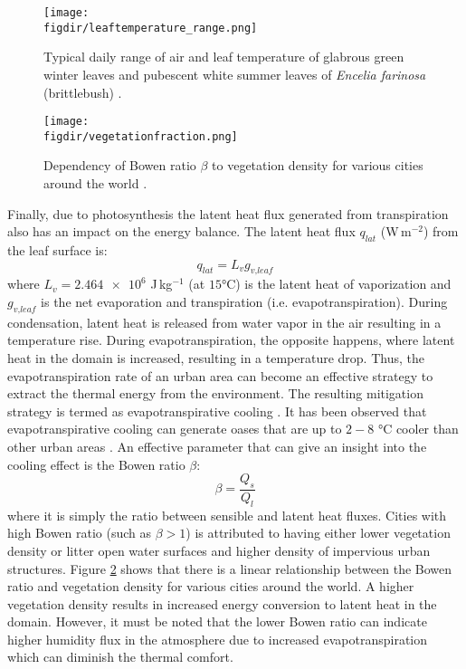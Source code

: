 \begin{figure}[p]
	\centering
	\texttt{[image: \\figdir/leaftemperature\_range.png]}
	\caption{Typical daily range of air and leaf temperature of glabrous green winter leaves and pubescent white summer leaves of \textit{Encelia farinosa} (brittlebush) \citep{Lambers2008}. }
	\label{fig:leaftemperature_range}
\end{figure}

\begin{figure}[p]
	\centering
	\texttt{[image: \\figdir/vegetationfraction.png]}
	\caption{Dependency of Bowen ratio $\beta$ to vegetation density for various cities around the world \citep{Oke2017a}. }
	\label{fig:vegetationfraction}
\end{figure}	

Finally, due to photosynthesis the latent heat flux generated from transpiration also has an impact on the energy balance. The latent heat flux $q_{\textit{lat}}$ (W\,m$^{-2}$) from the leaf surface is:
\begin{equation}
q_{\textit{lat}} = L_v g_{\textit{v,leaf}}
\end{equation}
where $L_v=\num{2.464e6}$ J\,kg$^{-1}$ (at $15$\si{\celsius}) is the latent heat of vaporization and $g_{\textit{v,leaf}}$ is the net evaporation and transpiration (i.e. evapotranspiration). During condensation, latent heat is released from water vapor in the air resulting in a temperature rise. During evapotranspiration, the opposite happens, where latent heat in the domain is increased, resulting in a temperature drop. Thus, the evapotranspiration rate of an urban area can become an effective strategy to extract the thermal energy from the environment. The resulting mitigation strategy is termed as evapotranspirative cooling \citep{Taha1997}. It has been observed that evapotranspirative cooling can generate oases that are up to $2-8$ \si{\celsius} cooler than other urban areas \citep{Oke1989,Taha1991}. An effective parameter that can give an insight into the cooling effect is the Bowen ratio $\beta$:
\begin{equation}
\beta = \frac{Q_s}{Q_l}
\end{equation}
where it is simply the ratio between sensible and latent heat fluxes. Cities with high Bowen ratio (such as $\beta > 1$) is attributed to having either lower vegetation density or litter open water surfaces and higher density of impervious urban structures. Figure \ref{fig:vegetationfraction} shows that there is a linear relationship between the Bowen ratio and vegetation density for various cities around the world. A higher vegetation density results in increased energy conversion to latent heat in the domain. However, it must be noted that the lower Bowen ratio can indicate higher humidity flux in the atmosphere due to increased evapotranspiration which can diminish the thermal comfort.


